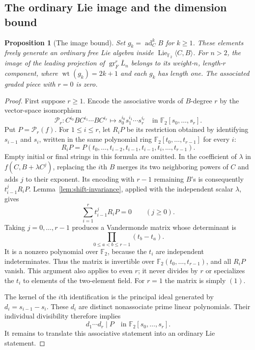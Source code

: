 \documentclass[11pt]{article}
\newtheorem{proposition}[theorem]{Proposition}
\theoremstyle{definition}
\theoremstyle{remark}
\numberwithin{equation}{section}
\begin{document}
\subsection{The ordinary Lie image and the dimension bound}
\begin{proposition}[The image bound]
\label{prop:image-bound}
Set $g_k=\operatorname{ad}_C^kB$ for $k\geq1$.
These elements freely generate an ordinary free Lie algebra inside
$\operatorname{Lie}_{{\mathbb F_2}}\langle C,B\rangle$.
For $n>2$, the image of the leading projection of
$\operatorname{gr}^r_F\overline L_n$ belongs to its weight-$n$,
length-$r$ component, where $\operatorname{wt}(g_k)=2k+1$ and each $g_k$ has
length one.
The associated graded piece with $r=0$ is zero.
\end{proposition}

\begin{proof}
First suppose $r\geq1$.
Encode the associative words of $B$-degree $r$ by the vector-space
isomorphism
\[
 \mathcal P_r:
 C^{i_0}BC^{i_1}\cdots BC^{i_r}
 \longmapsto s_0^{i_0}s_1^{i_1}\cdots s_r^{i_r}
 \quad\text{in }{\mathbb F_2}[s_0,\ldots,s_r].
\]
Put $P=\mathcal P_r(f)$.
For $1\leq i\leq r$, let $R_iP$ be its restriction obtained by
identifying $s_{i-1}$ and $s_i$, written in the same polynomial
ring ${\mathbb F_2}[t_0,\ldots,t_{r-1}]$ for every $i$:
\[
 R_iP=P(t_0,\ldots,t_{i-2},t_{i-1},t_{i-1},
               t_i,\ldots,t_{r-1}).
\]
Empty initial or final strings in this formula are omitted.
In the coefficient of $\lambda$ in $f(C,B+\lambda C^j)$, replacing
the $i$th $B$ merges its two neighboring powers of $C$ and adds
$j$ to their exponent.  Its encoding with $r-1$ remaining $B$'s
is consequently $t_{i-1}^{j}R_iP$.
Lemma~\ref{lem:shift-invariance}, applied with the independent
scalar $\lambda$, gives
\begin{equation}
 \label{eq:vandermonde-system}
 \sum_{i=1}^r t_{i-1}^{j}R_iP=0\qquad(j\geq0).
\end{equation}
Taking $j=0,\ldots,r-1$ produces a Vandermonde matrix whose
determinant is
\[
 \prod_{0\leq a<b\leq r-1}(t_b-t_a).
\]
It is a nonzero polynomial over ${\mathbb F_2}$, because the $t_i$ are
independent indeterminates.  Thus the matrix is invertible over
${\mathbb F_2}(t_0,\ldots,t_{r-1})$, and all $R_iP$ vanish.
This argument also applies to even $r$; it never divides by $r$
or specializes the $t_i$ to elements of the two-element field.
For $r=1$ the matrix is simply $(1)$.

The kernel of the $i$th identification is the principal ideal
generated by $d_i=s_{i-1}-s_i$.
These $d_i$ are distinct nonassociate prime linear polynomials.
Their individual divisibility therefore implies
\begin{equation}
 \label{eq:consecutive-divisibility}
 d_1\cdots d_r\mid P
 \quad\text{in }{\mathbb F_2}[s_0,\ldots,s_r].
\end{equation}
It remains to translate this associative statement into an
ordinary Lie statement.


\end{proof}
\end{document}
